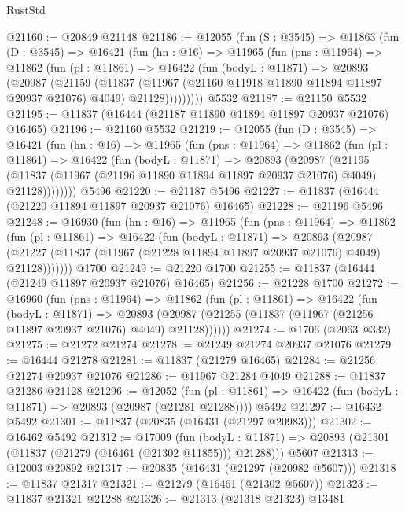\begin{lexlean}{RustStd}
\begin{coremodule}
@21160 := @20849 @21148
@21186 := @12055
    (fun (S : @3545) =>
    @11863
      (fun (D : @3545) =>
      @16421
        (fun (hn : @16) =>
        @11965
          (fun (pns : @11964) =>
          @11862
            (fun (pl : @11861) =>
            @16422
              (fun (bodyL : @11871) =>
              @20893
                (@20987
                  (@21159
                    (@11837
                      (@11967 (@21160 @11918 @11890 @11894 @11897 @20937 @21076) @4049)
                      @21128)))))))))
    @5532
@21187 := @21150 @5532
@21195 := @11837 (@16444 (@21187 @11890 @11894 @11897 @20937 @21076) @16465)
@21196 := @21160 @5532
@21219 := @12055
    (fun (D : @3545) =>
    @16421
      (fun (hn : @16) =>
      @11965
        (fun (pns : @11964) =>
        @11862
          (fun (pl : @11861) =>
          @16422
            (fun (bodyL : @11871) =>
            @20893
              (@20987
                (@21195
                  (@11837 (@11967 (@21196 @11890 @11894 @11897 @20937 @21076) @4049) @21128))))))))
    @5496
@21220 := @21187 @5496
@21227 := @11837 (@16444 (@21220 @11894 @11897 @20937 @21076) @16465)
@21228 := @21196 @5496
@21248 := @16930
    (fun (hn : @16) =>
    @11965
      (fun (pns : @11964) =>
      @11862
        (fun (pl : @11861) =>
        @16422
          (fun (bodyL : @11871) =>
          @20893
            (@20987
              (@21227 (@11837 (@11967 (@21228 @11894 @11897 @20937 @21076) @4049) @21128)))))))
    @1700
@21249 := @21220 @1700
@21255 := @11837 (@16444 (@21249 @11897 @20937 @21076) @16465)
@21256 := @21228 @1700
@21272 := @16960
    (fun (pns : @11964) =>
    @11862
      (fun (pl : @11861) =>
      @16422
        (fun (bodyL : @11871) =>
        @20893 (@20987 (@21255 (@11837 (@11967 (@21256 @11897 @20937 @21076) @4049) @21128))))))
@21274 := @1706 (@2063 @332)
@21275 := @21272 @21274
@21278 := @21249 @21274 @20937 @21076
@21279 := @16444 @21278
@21281 := @11837 (@21279 @16465)
@21284 := @21256 @21274 @20937 @21076
@21286 := @11967 @21284 @4049
@21288 := @11837 @21286 @21128
@21296 := @12052
    (fun (pl : @11861) => @16422 (fun (bodyL : @11871) => @20893 (@20987 (@21281 @21288))))
    @5492
@21297 := @16432 @5492
@21301 := @11837 (@20835 (@16431 (@21297 @20983)))
@21302 := @16462 @5492
@21312 := @17009
    (fun (bodyL : @11871) => @20893 (@21301 (@11837 (@21279 (@16461 (@21302 @11855))) @21288)))
    @5607
@21313 := @12003 @20892
@21317 := @20835 (@16431 (@21297 (@20982 @5607)))
@21318 := @11837 @21317
@21321 := @21279 (@16461 (@21302 @5607))
@21323 := @11837 @21321 @21288
@21326 := @21313 (@21318 @21323) @13481

\end{coremodule}
\end{lexlean}

